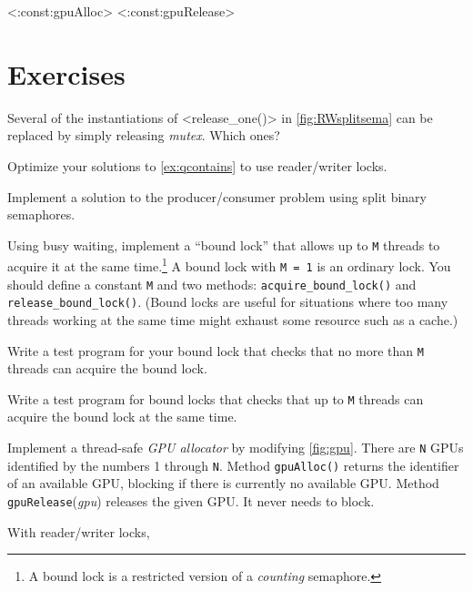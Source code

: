 \documentclass{report}
\begin{document}
{<{:const:gpuAlloc}>
<{:const:gpuRelease}>

\section*{Exercises}
\begin{problems}
\item Several of the instantiations of <{release_one()}> in
\autoref{fig:RWsplitsema} can be replaced by simply releasing \textit{mutex}.
Which ones?
\item Optimize your solutions to \autoref{ex:qcontains} to use reader/writer locks.
\item \label{ex:bbsbs} Implement a solution to the producer/consumer problem
using split binary semaphores.
\item \label{ex:boundlock} Using busy waiting, implement a ``bound lock'' that allows
up to \texttt{M} threads to acquire it at the same time.\footnote{A bound lock is a restricted version of a \emph{counting} semaphore.}
A bound lock
with \texttt{M = 1} is an ordinary lock.
You should define a constant \texttt{M} and two methods:
\texttt{acquire\_bound\_lock()}
and \texttt{release\_bound\_lock()}.
(Bound locks are useful for situations where too many threads working
at the same time might exhaust some resource such as a cache.)
\item Write a test program for your bound lock
that checks that no more than \texttt{M} threads can acquire the
bound lock.
\item Write a test program for bound locks
that checks that up to \texttt{M} threads
can acquire the bound lock at the same time.
\item \label{ex:gpu} Implement a thread-safe \emph{GPU allocator} by modifying
\autoref{fig:gpu}.
There are \texttt{N} GPUs identified by the numbers
1 through \texttt{N}.  Method \texttt{gpuAlloc()} returns the identifier
of an available GPU, blocking if there is currently no available GPU.
Method \texttt{gpuRelease}(\textit{gpu}) releases the given GPU.  It never needs
to block.
\item With reader/writer locks,

\end{problems}}
\end{document}

